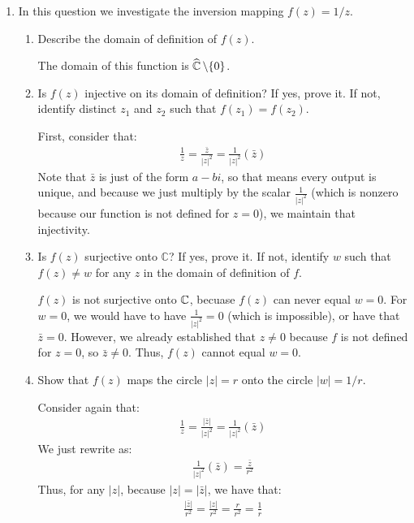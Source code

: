 \begin{enumerate}
	\item In this question we investigate the inversion mapping $f(z) = 1/z$.
	\begin{enumerate}
		\item Describe the domain of definition of $f(z)$.
		\begin{problem}
			The domain of this function is $\widehat{\mathbb{C}}\,\backslash\{0\}$.
		\end{problem}
		\item Is $f(z)$ injective on its domain of definition? If yes, prove it. If not, identify distinct $z_1$ and $z_2$ such that $f(z_1) = f(z_2)$.
		\begin{problem}
			First, consider that:
			\begin{align*}
				\frac{1}{z} = \frac{\bar z}{|z|^2} = \frac{1}{|z|^2}(\bar z)
			\end{align*}
			Note that $\bar z$ is just of the form $a - bi$, so that means every output is unique, and because we just multiply by the scalar $\frac{1}{|z|^2}$ (which is nonzero because our function is not defined for $z = 0$), we maintain that injectivity. 
		\end{problem}
		\item Is $f(z)$ surjective onto $\mathbb{C}$? If yes, prove it. If not, identify $w$ such that $f(z) \neq w$ for any $z$ in the domain of definition of $f$.
		\begin{problem}
			$f(z)$ is not surjective onto $\mathbb{C}$, becuase $f(z)$ can never equal $w = 0$. For $w = 0$, we would have to have $\frac{1}{|z|^2}=0$ (which is impossible), or have that $\bar z = 0$. However, we already established that $z \ne 0$ because $f$ is not defined for $z = 0$, so $\bar z \ne 0$. Thus, $f(z)$ cannot equal $w = 0$. 
		\end{problem}
		\item Show that $f(z)$ maps the circle $|z| = r$ onto the circle $|w| = 1/r$.
		\begin{problem}
			Consider again that:
			\begin{align*}
				\frac{1}{z} = \frac{|\bar z|}{|z|^2} = \frac{1}{|z|^2}(\bar z)
			\end{align*}
			We just rewrite as:
			\begin{align*}
				\frac{1}{|z|^2}(\bar z) = \frac{\bar z}{r^2}
			\end{align*}
			Thus, for any $|z|$, because $|z|=|\bar z|$, we have that:
			\begin{align*}
				\frac{|\bar z|}{r^2}=
				\frac{|z|}{r^2}=\frac{r}{r^2}=\frac{1}r
			\end{align*}

\end{problem}
\end{enumerate}
\end{enumerate}
